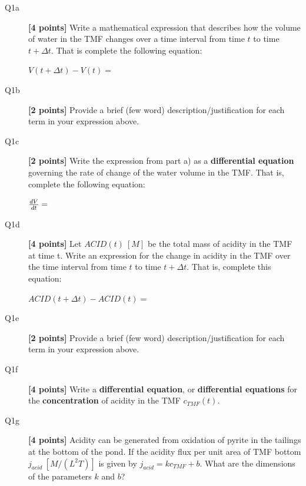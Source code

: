 \documentclass{article}
\begin{document}
\begin{description}
\item [Q1a] \textbf{[4 points]} Write a mathematical expression that describes how the volume of water in the TMF changes over a time interval from time $t$ to time $t+\Delta t$. That is complete the following equation: 

$ V(t+\Delta t) - V(t) =$
\vspace{1.0cm}
\item [Q1b] \textbf{[2 points]} Provide a brief  (few word) description/justification for each term in your expression above.
\vspace{1.5cm}
\item [Q1c] \textbf{[2 points]}  Write the expression from part a) as a \textbf{differential equation} governing the rate of change of the water volume in the TMF. That is, complete the following equation:

${dV\over dt}=$
\vspace{1.5cm}
\item [Q1d] \textbf{[4 points]}  Let $ACID(t)~[M]$ be the total mass of acidity in the TMF at time t. Write an expression for the change in acidity in the TMF over the time interval from time $t$ to time $t+\Delta t$. That is, complete this equation:

$ACID(t+\Delta t) - ACID(t) = $
\vspace{1.5cm}
\item [Q1e] \textbf{[2 points]} Provide a brief  (few word) description/justification for each term in your expression above.  
\vspace{1.5cm}
\item [Q1f] \textbf{[4 points]}   Write a \textbf{differential equation}, or \textbf{differential equations} for the \textbf{concentration} of acidity in the TMF $c_{TMF}(t)$.
\vspace{1.5cm}
\item [Q1g] \textbf{[4 points]} Acidity can be generated from oxidation of pyrite in the tailings at the bottom of the pond. If the acidity flux per unit area of TMF bottom  $j_{acid}~[M/(L^2 T)]$ is given by $j_{acid} = k c_{TMF} + b$. What are the dimensions of the parameters $k$ and $b$?
\vspace{1.5cm}


\end{description}
\end{document}
